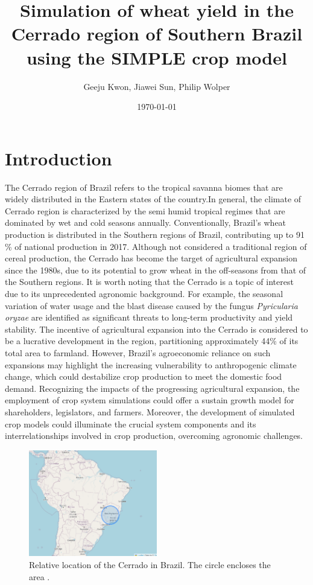 \documentclass[11pt]{article}
\author{Geeju Kwon, Jiawei Sun, Philip Wolper}
\date{\today}
\title{Simulation of wheat yield in the Cerrado region of Southern Brazil using the SIMPLE crop model}
\begin{document}
\maketitle

\section{Introduction}
\label{sec:orgb2fd94d}
The Cerrado region of Brazil refers to the tropical savanna biomes that are widely distributed in the Eastern states of the country.In general, the climate of Cerrado region is characterized by the semi humid tropical regimes that are dominated by wet and cold seasons annually. Conventionally, Brazil’s wheat production is distributed in the Southern regions of Brazil, contributing up to 91 \% of national production in 2017. Although not considered a traditional region of cereal production, the Cerrado has become the target of agricultural expansion since the 1980s, due to its potential to grow wheat in the off-seasons from that of the Southern regions. It is worth noting that the Cerrado is a topic of interest due to its unprecedented agronomic background. For example, the seasonal variation of water usage and the blast disease caused by the fungus \emph{Pyricularia oryzae} are identified as significant threats to long-term productivity and yield stability. The incentive of agricultural expansion into the Cerrado is considered to be a lucrative development in the region, partitioning approximately 44\% of its total area to farmland. However, Brazil’s agroeconomic reliance on such expansions may highlight the increasing vulnerability to anthropogenic climate change, which could destabilize crop production to meet the domestic food demand. Recognizing the impacts of the progressing agricultural expansion, the employment of crop system simulations could offer a sustain growth model for shareholders, legislators, and farmers. Moreover, the development of simulated crop models could illuminate the crucial system components and its interrelationships involved in crop production, overcoming agronomic challenges.\\

\begin{figure}[htbp]
\centering
\includegraphics[width=0.5\textwidth]{./figures/Brazil with cerrado.png}
\caption{Relative location of the Cerrado in Brazil. The circle encloses the area .}
\end{figure}
\end{document}
